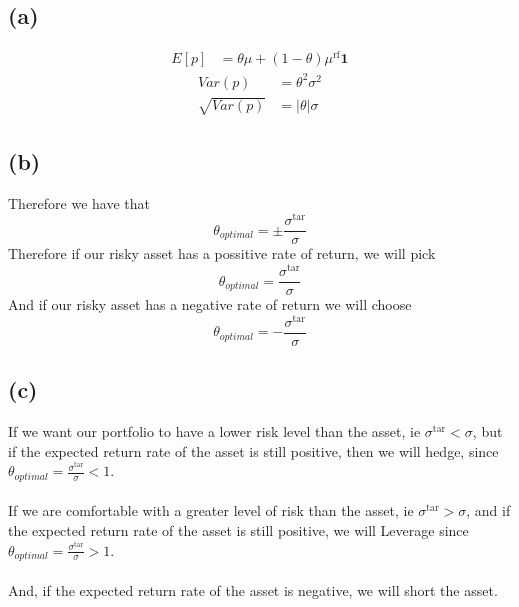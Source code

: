 \subsection*{(a)}
\begin{align*}
	E[p]&=\boxed{\theta\mu+(1-\theta)\mu^{\text{rf}}\textbf{1}}
\end{align*}
\begin{align*}
	Var(p)&=\theta^2\sigma^2\\
	\sqrt{Var(p)}&=\boxed{|\theta|\sigma}
\end{align*}
\subsection*{(b)}
Therefore we have that 
$$\theta_{optimal}=\pm \frac{\sigma^{\text{tar}}}{\sigma}$$
Therefore if our risky asset has a possitive rate of return, we will pick
$$\theta_{optimal}=\boxed{\frac{\sigma^{\text{tar}}}{\sigma}}$$
And if our risky asset has a negative rate of return we will choose
$$\theta_{optimal}=\boxed{-\frac{\sigma^{\text{tar}}}{\sigma}}$$
\subsection*{(c)}
If we want our portfolio to have a lower risk level than the asset, ie $\sigma^{\text{tar}}<\sigma$,
but if the expected return rate of the asset is still positive, then we will hedge,
since $\theta_{optimal}=\frac{\sigma^{\text{tar}}}{\sigma}<1$.\\\\
If we are comfortable with a greater level of risk than the asset, ie $\sigma^{\text{tar}}>\sigma$, and
if the expected return rate of the asset is still positive, we will Leverage
since $\theta_{optimal}=\frac{\sigma^{\text{tar}}}{\sigma}>1$.\\\\
And, if the expected return rate of the asset is negative, we will short the asset.
